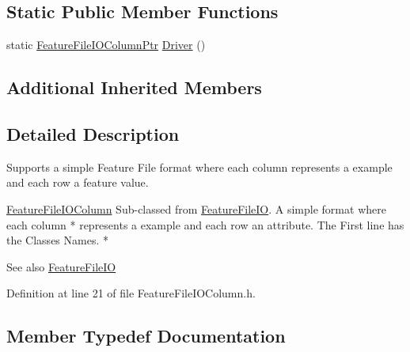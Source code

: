 \subsection*{Static Public Member Functions}
\begin{DoxyCompactItemize}
\item 
static \hyperlink{class_k_k_m_l_l_1_1_feature_file_i_o_column_aa10d6d26b30e5280faf79e11863b49bc}{Feature\+File\+I\+O\+Column\+Ptr} \hyperlink{class_k_k_m_l_l_1_1_feature_file_i_o_column_a6e2c6df90f161e3354737d040a2340de}{Driver} ()
\end{DoxyCompactItemize}
\subsection*{Additional Inherited Members}


\subsection{Detailed Description}
Supports a simple Feature File format where each column represents a example and each row a feature value. 


\begin{DoxyCode}
\hyperlink{class_k_k_m_l_l_1_1_feature_file_i_o_column_a0dfa4260d0338abd417efc09b8c719c3}{FeatureFileIOColumn}    Sub-classed from \hyperlink{class_k_k_m_l_l_1_1_feature_file_i_o_a820170380cfca6a036a29d2c51b8441a}{FeatureFileIO}.  A simple format 
      where each column   *
represents a  example and each row an attribute.  The First line has the Classes Names.     *
\end{DoxyCode}
 \begin{DoxySeeAlso}{See also}
\hyperlink{class_k_k_m_l_l_1_1_feature_file_i_o}{Feature\+File\+IO} 
\end{DoxySeeAlso}


Definition at line 21 of file Feature\+File\+I\+O\+Column.\+h.



\subsection{Member Typedef Documentation}

